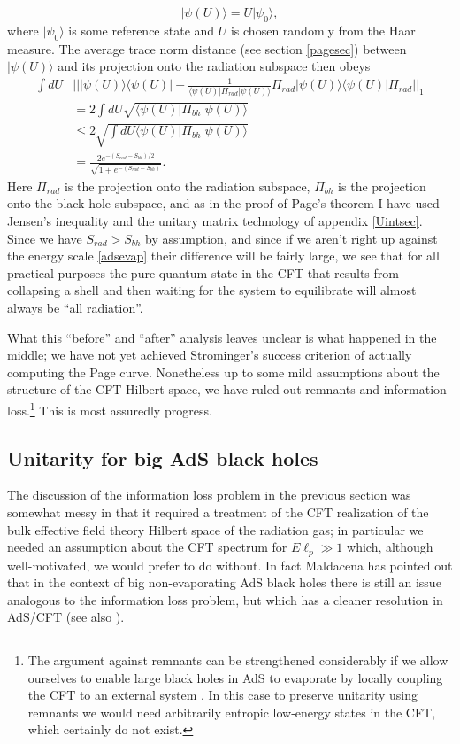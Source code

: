 \documentclass[12pt]{article}
\newcommand{\be}{\begin{equation}}
\newcommand{\ee}{\end{equation}}
\newcommand{\lan}{\langle}
\newcommand{\ran}{\rangle}
\begin{document}
\be
|\psi(U)\ran=U|\psi_0\ran,
\ee
where $|\psi_0\ran$ is some reference state and $U$ is chosen randomly from the Haar measure.  The average trace norm distance (see section \ref{pagesec}) between $|\psi(U)\ran$ and its projection onto the radiation subspace then obeys
\begin{align}\nonumber
\int dU&\Big|\Big||\psi(U)\ran \lan \psi(U)|-\frac{1}{\lan\psi(U)|\Pi_{\mathit{rad}}|\psi(U)\ran}\Pi_{\mathit{rad}}|\psi(U)\ran \lan \psi(U)|\Pi_{\mathit{rad}}\Big|\Big|_1\\\nonumber
&=2\int dU \sqrt{\lan \psi(U)|\Pi_{\mathit{bh}}|\psi(U)\ran}\\\nonumber
&\leq 2 \sqrt{\int dU \lan \psi(U)|\Pi_{\mathit{bh}}|\psi(U)\ran}\\
&=\frac{2e^{-(S_{\mathit{rad}}-S_{\mathit{bh}})/2}}{\sqrt{1+e^{-(S_{\mathit{rad}}-S_{\mathit{bh}})}}}.
\end{align}
Here $\Pi_{\mathit{rad}}$ is the projection onto the radiation subspace, $\Pi_{\mathit{bh}}$ is the projection onto the black hole subspace, and as in the proof of Page's theorem I have used Jensen's inequality and the unitary matrix technology of appendix \ref{Uintsec}.  Since we have $S_{\mathit{rad}}>S_{\mathit{bh}}$ by assumption, and since if we aren't right up against the energy scale \eqref{adsevap} their difference will be fairly large, we see that for all practical purposes the pure quantum state in the CFT that results from collapsing a shell and then waiting for the system to equilibrate will almost always be ``all radiation''.  

What this ``before'' and ``after'' analysis leaves unclear is what happened in the middle; we have not yet achieved Strominger's success criterion of actually computing the Page curve.  Nonetheless up to some mild assumptions about the structure of the CFT Hilbert space, we have ruled out remnants and information loss.\footnote{The argument against remnants can be strengthened considerably if we allow ourselves to enable large black holes in AdS to evaporate by locally coupling the CFT to an external system \cite{Rocha:2008fe}.  In this case to preserve unitarity using remnants we would need arbitrarily entropic low-energy states in the CFT, which certainly do not exist.}  This is most assuredly progress.

\subsection{Unitarity for big AdS black holes}\label{bigUsec}
The discussion of the information loss problem in the previous section was somewhat messy in that it required a treatment of the CFT realization of the bulk effective field theory Hilbert space of the radiation gas; in particular we needed an assumption about the CFT spectrum for $E\ell_p\gg 1$ which, although well-motivated, we would prefer to do without.  In fact Maldacena has pointed out that in the context of big non-evaporating AdS black holes there is still an issue analogous to the information loss problem, but which has a cleaner resolution in AdS/CFT \cite{Maldacena:2001kr} (see also \cite{Barbon:2003aq,Barbon:2014rma}).
\end{document}
